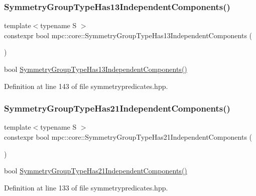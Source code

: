 \subsubsection{\texorpdfstring{Symmetry\+Group\+Type\+Has13\+Independent\+Components()}{SymmetryGroupTypeHas13IndependentComponents()}}
{\footnotesize\ttfamily template$<$typename S $>$ \\
constexpr bool mpc\+::core\+::\+Symmetry\+Group\+Type\+Has13\+Independent\+Components (\begin{DoxyParamCaption}{ }\end{DoxyParamCaption})\hspace{0.3cm}{\ttfamily [inline]}}

bool \mbox{\hyperlink{namespacempc_1_1core_a384195f1b9c2914504451efcbd89f188}{Symmetry\+Group\+Type\+Has13\+Independent\+Components()}} 

Definition at line 143 of file symmetrypredicates.\+hpp.

\mbox{\label{namespacempc_1_1core_ae6d0b15349b8bc18ab64a31b19fdd553}} 
\subsubsection{\texorpdfstring{Symmetry\+Group\+Type\+Has21\+Independent\+Components()}{SymmetryGroupTypeHas21IndependentComponents()}}
{\footnotesize\ttfamily template$<$typename S $>$ \\
constexpr bool mpc\+::core\+::\+Symmetry\+Group\+Type\+Has21\+Independent\+Components (\begin{DoxyParamCaption}{ }\end{DoxyParamCaption})\hspace{0.3cm}{\ttfamily [inline]}}

bool \mbox{\hyperlink{namespacempc_1_1core_ae6d0b15349b8bc18ab64a31b19fdd553}{Symmetry\+Group\+Type\+Has21\+Independent\+Components()}} 

Definition at line 133 of file symmetrypredicates.\+hpp.

\mbox{\label{namespacempc_1_1core_a5ff452bd2a36ed7bfbaff4e81d07290f}} 
